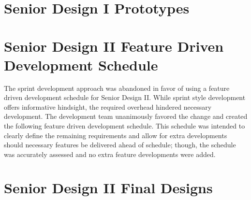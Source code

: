     \newpage
    
    \newpage
    
    \newpage
    
    \newpage
    
    \newpage
    
    \newpage
    
    \newpage
    \section{Senior Design I Prototypes}
    
    \newpage
    \section{Senior Design II Feature Driven Development Schedule}
        The sprint development approach was abandoned in favor of using a feature driven development schedule for Senior Design II. While sprint style development offers informative hindsight, the required overhead hindered necessary development. The development team unanimously favored the change and created the following feature driven development schedule. This schedule was intended to clearly define the remaining requirements and allow for extra developments should necessary features be delivered ahead of schedule; though, the schedule was accurately assessed and no extra feature developments were added.
        
    \label{section:SpringSprintSchedule}
    
    \newpage
    \section{Senior Design II Final Designs}
    
    
